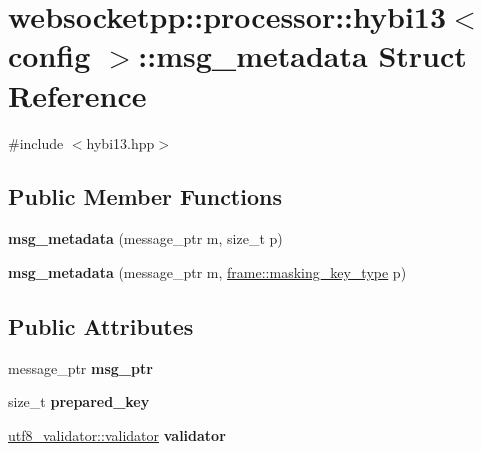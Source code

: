 \hypertarget{structwebsocketpp_1_1processor_1_1hybi13_1_1msg__metadata}{}\section{websocketpp\+:\+:processor\+:\+:hybi13$<$ config $>$\+:\+:msg\+\_\+metadata Struct Reference}
\label{structwebsocketpp_1_1processor_1_1hybi13_1_1msg__metadata}


{\ttfamily \#include $<$hybi13.\+hpp$>$}

\subsection*{Public Member Functions}
\begin{DoxyCompactItemize}
\item 
{\bfseries msg\+\_\+metadata} (message\+\_\+ptr m, size\+\_\+t p)\hypertarget{structwebsocketpp_1_1processor_1_1hybi13_1_1msg__metadata_a386f3ee3c7e1779a8da19385cf14a418}{}\label{structwebsocketpp_1_1processor_1_1hybi13_1_1msg__metadata_a386f3ee3c7e1779a8da19385cf14a418}

\item 
{\bfseries msg\+\_\+metadata} (message\+\_\+ptr m, \hyperlink{unionwebsocketpp_1_1frame_1_1uint32__converter}{frame\+::masking\+\_\+key\+\_\+type} p)\hypertarget{structwebsocketpp_1_1processor_1_1hybi13_1_1msg__metadata_ad5e5baeb6fe05bea4f6569c3635558f8}{}\label{structwebsocketpp_1_1processor_1_1hybi13_1_1msg__metadata_ad5e5baeb6fe05bea4f6569c3635558f8}

\end{DoxyCompactItemize}
\subsection*{Public Attributes}
\begin{DoxyCompactItemize}
\item 
message\+\_\+ptr {\bfseries msg\+\_\+ptr}\hypertarget{structwebsocketpp_1_1processor_1_1hybi13_1_1msg__metadata_a49e276abf3be14de45a9111cb13e3d81}{}\label{structwebsocketpp_1_1processor_1_1hybi13_1_1msg__metadata_a49e276abf3be14de45a9111cb13e3d81}

\item 
size\+\_\+t {\bfseries prepared\+\_\+key}\hypertarget{structwebsocketpp_1_1processor_1_1hybi13_1_1msg__metadata_a4c0cf4af697b0a12396ca5570a888ec1}{}\label{structwebsocketpp_1_1processor_1_1hybi13_1_1msg__metadata_a4c0cf4af697b0a12396ca5570a888ec1}

\item 
\hyperlink{classwebsocketpp_1_1utf8__validator_1_1validator}{utf8\+\_\+validator\+::validator} {\bfseries validator}\hypertarget{structwebsocketpp_1_1processor_1_1hybi13_1_1msg__metadata_a283c8d119c2c9f2543a2247b465c9416}{}\label{structwebsocketpp_1_1processor_1_1hybi13_1_1msg__metadata_a283c8d119c2c9f2543a2247b465c9416}

\end{DoxyCompactItemize}


